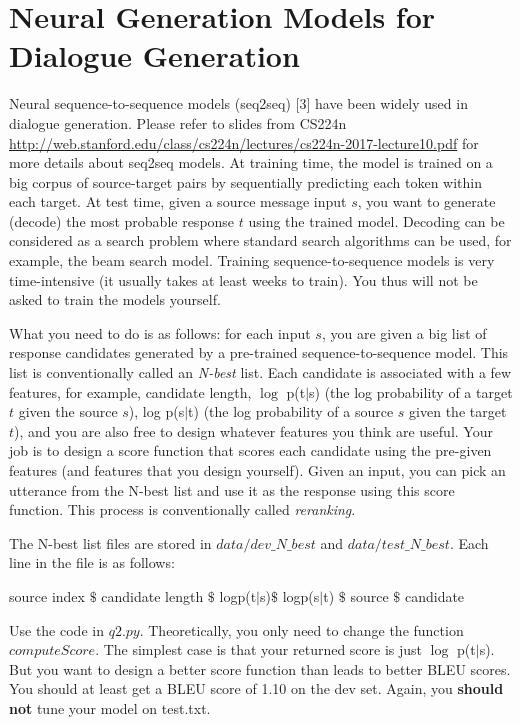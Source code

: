 \documentclass{article}
\begin{document}
\section{Neural Generation Models for Dialogue Generation}
Neural sequence-to-sequence models (seq2seq)  [3] have been widely used in dialogue generation. 
Please refer to
slides from CS224n 
 \url{http://web.stanford.edu/class/cs224n/lectures/cs224n-2017-lecture10.pdf} for more details about seq2seq models.
At training time, 
the model is trained on a big corpus of source-target pairs by sequentially predicting each token within each target. At test time, given a source message input $s$, you want to generate (decode) the most probable response $t$ using the trained model. 
Decoding 
can be considered as 
a search problem where standard search algorithms can be used, for example, the beam search model.   
Training sequence-to-sequence models is very time-intensive (it usually takes at least weeks to train). You thus will not be asked to train the models yourself. 

What you need to do is as follows:
for each input $s$, you are given a big list of response candidates generated by a pre-trained sequence-to-sequence model. 
This list is conventionally called an {\it N-best} list. Each candidate is associated with a few features, for example, candidate length, $\log$ p(t$|$s) (the log probability of a target $t$ given the source $s$), log p(s$|$t)
(the log probability of a source $s$ given the target $t$), and you are also free to design whatever features you think are useful. 
Your job is to design a score function that scores each candidate using the  pre-given features (and features that you design yourself). 
Given an input, you can 
pick an utterance from the N-best list and use it as the response using this score function.
 This process is conventionally called {\it reranking}.

The N-best list files are stored in $data/dev\_N\_best$ and $data/test\_N\_best$. 
Each line in the file is as follows:
\begin{center}
source index $\$$ candidate length $\$$ logp(t$|$s)$\$$ logp(s$|$t) $\$$ source $\$$ candidate
\end{center}

Use the code in $q2.py$. Theoretically, you only need to change the function $computeScore$. 
The simplest case is that your returned score is just $\log$ p(t$|$s). But you want to design a better score function than leads to better BLEU scores.
You should at least get a BLEU score of 1.10 on the dev set.
Again, you {\bf should not} tune your model on test.txt.
\end{document}
